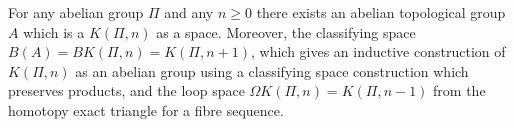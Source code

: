 For any abelian group $\Pi$ and any $n \geq 0$ there exists an abelian topological group $A$ which is a $K(\Pi, n)$ as a space. Moreover, the classifying space $B(A) = BK(\Pi, n) = K(\Pi, n + 1)$, which gives an inductive construction of $K(\Pi, n)$ as an abelian group using a classifying space construction which preserves products, and the loop space $\Omega K(\Pi, n) = K(\Pi, n - 1)$ from the homotopy exact triangle for a fibre sequence.
